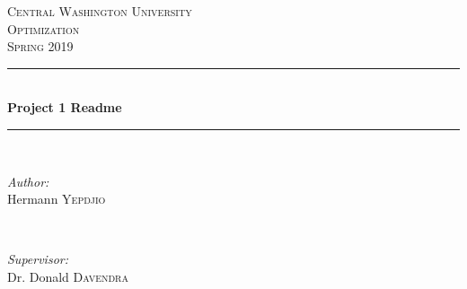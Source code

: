 \documentclass[12pt]{article}
\begin{document}
	
	\begin{titlepage}
		
		\newcommand{\HRule}{\rule{\linewidth}{0.5mm}} %
		
		\center %
		
		
		\textsc{\LARGE Central Washington University}\\[1.5cm] %
		\textsc{\Large Optimization}\\[0.5cm] %
		\textsc{\large Spring 2019}\\[0.5cm] %
		
		
		\HRule \\[0.4cm]
		{ \huge \bfseries Project 1 Readme}\\[0.4cm] %
		\HRule \\[1.5cm]
		
		
		\begin{minipage}{0.4\textwidth}
			\begin{flushleft} \large
				\emph{Author:}\\
				Hermann \textsc{Yepdjio} %
			\end{flushleft}
		\end{minipage}
		~
		\begin{minipage}{0.4\textwidth}
			\begin{flushright} \large
				\emph{Supervisor:} \\
				Dr. Donald \textsc{Davendra} %
			\end{flushright}
		\end{minipage}\\[1cm]
		

\end{titlepage}
\end{document}

